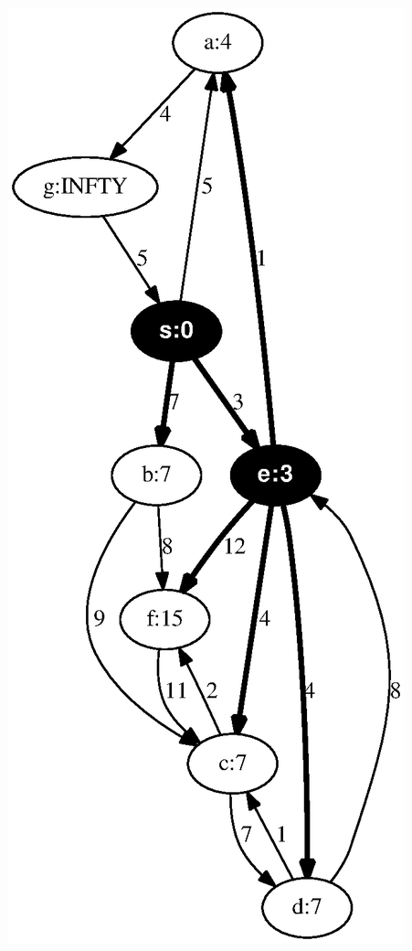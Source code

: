 \documentclass{article}
\begin{document}
\includegraphics[width=0.303030303030303\linewidth]{dijkstra_gross_yellen_02.eps}
\vspace{1em}
\end{document}
